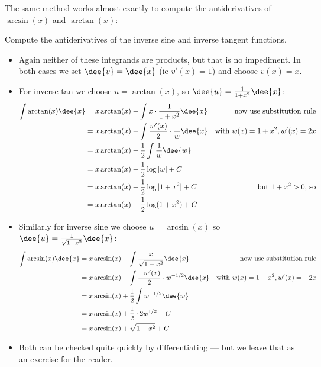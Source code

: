 The same method works almost exactly to compute the antiderivatives of
$\arcsin(x)$ and $\arctan(x)$:
\begin{eg}\label{eg:invtan}
 Compute the antiderivatives of the inverse sine and inverse tangent functions.

\soln
\begin{itemize}
 \item Again neither of these integrands are products, but that is no
impediment. In both cases we set $\dee{v}=\dee{x}$ (ie $v'(x)=1$) and choose $v(x)=x$.
\item For inverse tan we choose $u=\arctan(x)$, so
$\dee{u}=\frac{1}{1+x^2}\dee{x}$:
\begin{align*}
  \int \arctan(x) \dee{x}
&= x \arctan(x) - \int x \cdot \frac{1}{1+x^2} \dee{x}
& \text{now use substitution rule}\\
&= x \arctan(x) - \int \frac{w'(x)}{2} \cdot \frac{1}{w} \dee{x} & \text{with
$w(x)=1+x^2, w'(x)=2x$} \\
  &= x \arctan(x) - \frac{1}{2} \int \frac{1}{w} \dee{w} \\
  &= x \arctan(x) - \frac{1}{2}\log |w| + C \\
  &= x \arctan(x) - \frac{1}{2} \log|1+x^2| + C & \text{but $1+x^2>0$, so}\\
  &= x \arctan(x) - \frac{1}{2} \log(1+x^2) + C
\end{align*}
\item Similarly for inverse sine we choose $u=\arcsin(x)$ so $\dee{u} =
\frac{1}{\sqrt{1-x^2}}\dee{x}$:
\begin{align*}
  \int \arcsin(x) \dee{x}
&= x \arcsin(x) - \int \frac{x}{\sqrt{1-x^2}} \dee{x}
&\text{now use substitution rule}\\
&= x \arcsin(x) - \int \frac{-w'(x)}{2} \cdot w^{-1/2} \dee{x}
& \text{with $w(x)=1-x^2, w'(x)=-2x$}\\
&= x\arcsin(x) + \frac{1}{2} \int w^{-1/2} \dee{w} \\
&= x \arcsin(x) + \frac{1}{2} \cdot 2 w^{1/2} + C \\
&= x\arcsin(x) + \sqrt{1-x^2} + C
\end{align*}
\item Both can be checked quite quickly by differentiating --- but we leave
that as an exercise for the reader.
\end{itemize}

\end{eg}

